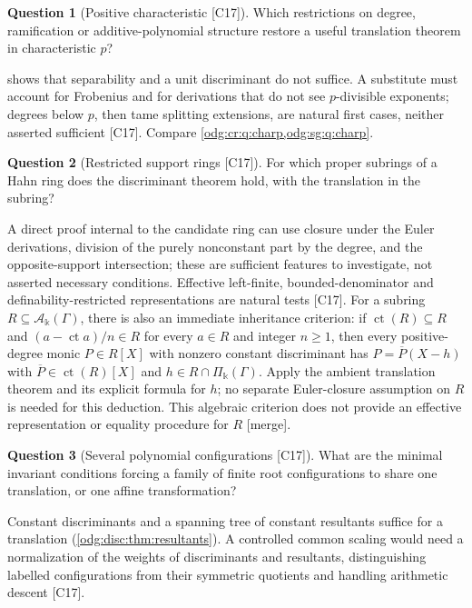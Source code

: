\documentclass[11pt,oneside]{article}
\numberwithin{equation}{section}
\theoremstyle{definition}
\newtheorem{question}[question]{Question}
\theoremstyle{remark}
\newcommand{\ct}{\operatorname{ct}}
\newcommand{\src}[1]{\textup{\textsf{\small[#1]}}}
\newcommand{\mergetag}{\textup{\textsf{\small[merge]}}}
\newcommand{\crA}{\mathcal A_\Bbbk(\Gamma)}
\newcommand{\crP}{\Pi_\Bbbk(\Gamma)}
\begin{document}
\begin{question}[Positive characteristic \src{C17}]\label{odg:disc:q:charp}
Which restrictions on degree, ramification or additive-polynomial structure restore a
useful translation theorem in characteristic $p$?
\end{question}
 shows that separability and a unit discriminant do not suffice. A
substitute must account for Frobenius and for derivations that do not see $p$-divisible
exponents; degrees below $p$, then tame splitting extensions, are natural first cases,
neither asserted sufficient \src{C17}. Compare \cref{odg:cr:q:charp,odg:sg:q:charp}.

\begin{question}[Restricted support rings \src{C17}]\label{odg:disc:q:restricted}
For which proper subrings of a Hahn ring does the discriminant theorem hold, with the
translation in the subring?
\end{question}
A direct proof internal to the candidate ring can use closure under the Euler derivations,
division of the purely nonconstant part by the degree, and the opposite-support
intersection; these are sufficient features to investigate, not asserted necessary
conditions. Effective left-finite, bounded-denominator and definability-restricted
representations are natural tests \src{C17}.
For a subring $R\subseteq\crA$, there is also an immediate inheritance criterion:
if $\ct(R)\subseteq R$ and $(a-\ct a)/n\in R$ for every $a\in R$ and integer $n\ge1$,
then every positive-degree monic $P\in R[X]$ with nonzero constant discriminant has
$P=\overline P(X-h)$ with $\overline P\in\ct(R)[X]$ and $h\in R\cap\crP$.
Apply the ambient translation theorem and its explicit formula for $h$; no separate
Euler-closure assumption on $R$ is needed for this deduction. This algebraic criterion
does not provide an effective representation or equality procedure for $R$ \mergetag.

\begin{question}[Several polynomial configurations \src{C17}]\label{odg:disc:q:several}
What are the minimal invariant conditions forcing a family of finite root configurations to
share one translation, or one affine transformation?
\end{question}
Constant discriminants and a spanning tree of constant resultants suffice for a translation
(\cref{odg:disc:thm:resultants}). A controlled common scaling would need a normalization of
the weights of discriminants and resultants, distinguishing labelled configurations from
their symmetric quotients and handling arithmetic descent \src{C17}.
\end{document}
